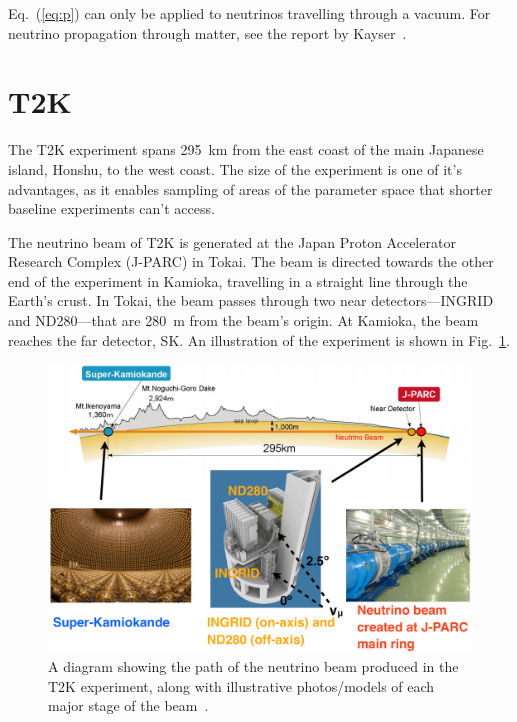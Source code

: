 \documentclass[aps,pra,12pt,notitlepage,tightenlines]{revtex4-1}
\begin{document}
Eq.~(\ref{eq:p}) can only be applied to neutrinos travelling through a vacuum. For neutrino propagation through matter, see the report by Kayser~\cite{Kayser:2005cd}.

\section{T2K}
The T2K experiment spans 295~km from the east coast of the main Japanese island, Honshu, to the west coast. The size of the experiment is one of it's advantages, as it enables sampling of areas of the parameter space that shorter baseline experiments can't access. 

The neutrino beam of T2K is generated at the Japan Proton Accelerator Research Complex (J-PARC) in Tokai. The beam is directed towards the other end of the experiment in Kamioka, travelling in a straight line through the Earth's crust. In Tokai, the beam passes through two near detectors---INGRID and ND280---that are 280~m from the beam's origin. At Kamioka, the beam reaches the far detector, SK. An illustration of the experiment is shown in Fig.\ \ref{fig:t2k}.
\begin{figure}
 \includegraphics[scale=0.33]{T2K_detail}
 \caption{A diagram showing the path of the neutrino beam produced in the T2K experiment, along with illustrative photos/models of each major stage of the beam~\cite{Jamieson:2015rza}.}
 \label{fig:t2k}
\end{figure}
\end{document}
